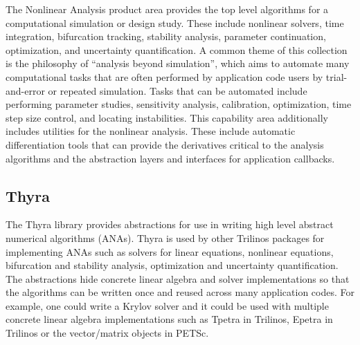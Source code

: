 
The Nonlinear Analysis product area provides the top level algorithms for a computational simulation or design study.
These include nonlinear solvers, time integration, bifurcation tracking, stability analysis, parameter continuation, optimization, and uncertainty quantification.
A common theme of this collection is the philosophy of ``analysis beyond simulation'', which aims to automate many computational tasks that are often performed by application code users by trial-and-error or repeated simulation.
Tasks that can be automated include performing parameter studies, sensitivity analysis, calibration, optimization, time step size control, and locating instabilities.
This capability area additionally includes utilities for the nonlinear analysis. These include automatic differentiation tools that can provide the derivatives critical to the analysis algorithms and the abstraction layers and interfaces for application callbacks.

\subsection{Thyra}
The Thyra library provides abstractions for use in writing high level abstract numerical algorithms (ANAs).
Thyra is used by other Trilinos packages for implementing ANAs such as solvers for linear equations, nonlinear equations, bifurcation and stability analysis, optimization and uncertainty quantification.
The abstractions hide concrete linear algebra and solver implementations so that the algorithms can be written once and reused across many application codes.
For example, one could write a Krylov solver and it could be used with multiple concrete linear algebra implementations such as Tpetra in Trilinos, Epetra in Trilinos or the vector/matrix objects in PETSc.

